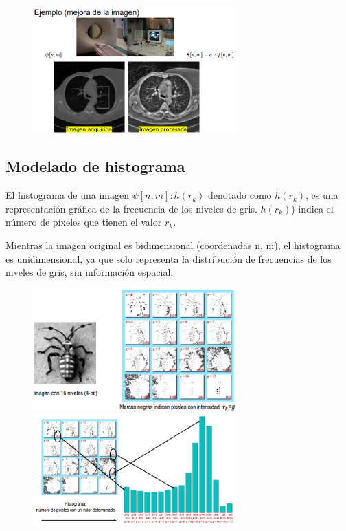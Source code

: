 \begin{figure}[h]
\centering
\includegraphics[width = 0.7\textwidth]{figs/mejora-puntual.png}
\end{figure}

\subsection{Modelado de histograma}
El histograma de una imagen $\psi[n,m]: h(r_k)$ denotado como $h(r_k)$, es una representación gráfica de la frecuencia de los niveles de gris. $h(r_k)$) indica el número de píxeles que tienen el valor $r_k$. 

Mientras la imagen original es bidimensional (coordenadas n, m), el histograma es unidimensional, ya que solo representa la distribución de frecuencias de los niveles de gris, sin información espacial.

\begin{figure}[h]
\centering
\includegraphics[width = 0.7\textwidth]{figs/histograma1.png}
\includegraphics[width = 0.7\textwidth]{figs/histograma2.png}
\end{figure}

